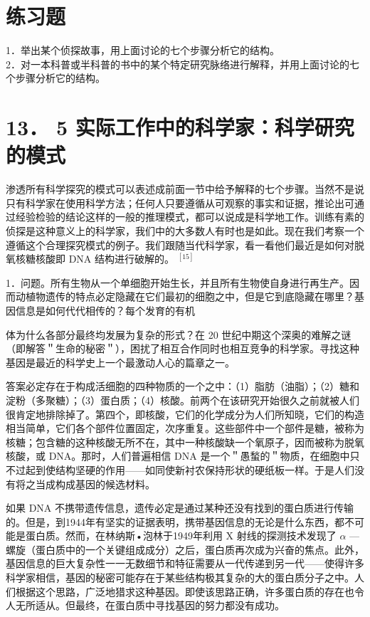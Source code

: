 \section*{练习题}
1．举出某个侦探故事，用上面讨论的七个步骤分析它的结构。\\
2．对一本科普或半科普的书中的某个特定研究脉络进行解释，并用上面讨论的七个步骤分析它的结构。

\section*{13． 5 实际工作中的科学家：科学研究的模式}
渗透所有科学探究的模式可以表述成前面一节中给予解释的七个步骤。当然不是说只有科学家在使用科学方法；任何人只要遵循从可观察的事实和证据，推论出可通过经验检验的结论这样的一般的推理模式，都可以说成是科学地工作。训练有素的侦探是这种意义上的科学家，我们中的大多数人有时也是如此。现在我们考察一个遵循这个合理探究模式的例子。我们跟随当代科学家，看一看他们最近是如何对脱氧核糖核酸即 DNA 结构进行破解的。 ${ }^{[15]}$

1．问题。所有生物从一个单细胞开始生长，并且所有生物使自身进行再生产。因而动植物遗传的特点必定隐藏在它们最初的细胞之中，但是它到底隐藏在哪里？基因信息是如何代代相传的？每个发育的有机

体为什么各部分最终均发展为复杂的形式？在 20 世纪中期这个深奥的难解之谜（即解答＂生命的秘密＂），困扰了相互合作同时也相互竞争的科学家。寻找这种基因是最近的科学史上一个最激动人心的篇章之一。

答案必定存在于构成活细胞的四种物质的一个之中：（1）脂肪（油脂）；（2）糖和淀粉（多聚糖）；（3）蛋白质；（4）核酸。前两个在该研究开始很久之前就被人们很肯定地排除掉了。第四个，即核酸，它们的化学成分为人们所知晓，它们的构造相当简单，它们各个部件位置固定，次序重复。这些部件中一个部件是糖，被称为核糖；包含糖的这种核酸无所不在，其中一种核酸缺一个氧原子，因而被称为脱氧核酸，或 DNA。那时，人们普遍相信 DNA 是一个＂愚蝵的＂物质，在细胞中只不过起到使结构坚硬的作用——如同使新衬农保持形状的硬纸板一样。于是人们没有将之当成构成基因的候选材料。

如果 DNA 不携带遗传信息，遗传必定是通过某种还没有找到的蛋白质进行传输的。但是，到1944年有坚实的证据表明，携带基因信息的无论是什么东西，都不可能是蛋白质。然而，在林纳斯•泡林于1949年利用 X 射线的探测技术发现了 $\alpha$ —螺旋（蛋白质中的一个关键组成成分）之后，蛋白质再次成为兴奋的焦点。此外，基因信息的巨大复杂性一一无数细节和特征需要从一代传递到另一代——使得许多科学家相信，基因的秘密可能存在于某些结构极其复杂的大的蛋白质分子之中。人们根据这个思路，广泛地猎求这种基因。即使该思路正确，许多蛋白质的存在也令人无所适从。但最终，在蛋白质中寻找基因的努力都没有成功。

